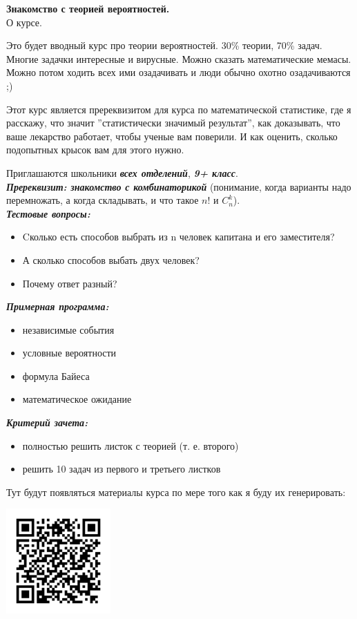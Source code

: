 \documentclass[11pt,a4paper]{article}
\renewcommand{\!}{\textcolor{red}{!}}
\newcommand{\EMPH}[1]{{\large \textit{\textbf{#1}}}}
\begin{document}
\pagestyle{empty}

\begin{center}
	\large
	\textbf{Знакомство с теорией вероятностей.}\\
	\normalsize
	О курсе.
\end{center}


Это будет вводный курс про теории вероятностей. 30\% теории, 70\% задач. Многие задачки интересные и вирусные. Можно сказать математические мемасы. Можно потом ходить всех ими озадачивать и люди обычно охотно озадачиваются ;)

Этот курс является пререквизитом для курса по математической статистике, где я расскажу, что значит ''статистически значимый результат'', как доказывать, что ваше лекарство работает, чтобы ученые вам поверили. И как оценить, сколько подопытных крысок вам для этого нужно.

\vspace{1cm}
Приглашаются школьники \EMPH{всех отделений}, \EMPH{9+ класс}.\\
\EMPH{Пререквизит: знакомство с комбинаторикой} (понимание, когда варианты надо перемножать, а когда складывать, и что такое $n!$ и $C_n^k$).\\
\EMPH{Тестовые вопросы:}
\begin{itemize}
	\setlength\itemsep{0em}
	\item Cколько есть способов выбрать из n человек капитана и его заместителя?
	\item А сколько способов выбать двух человек?
	\item Почему ответ разный?
\end{itemize}
\EMPH{Примерная программа:}
\begin{itemize}
	\setlength\itemsep{0em}
	\item независимые события
	\item условные вероятности
	\item формула Байеса
	\item математическое ожидание
\end{itemize}
\EMPH{Критерий зачета:}
\begin{itemize}
	\item полностью решить листок с теорией (т. е. второго)
	\item решить 10 задач из первого и третьего листков
\end{itemize}

Тут будут появляться материалы курса по мере того как я буду их генерировать:

\begin{center}
	\includegraphics[width=0.3\textwidth]{qr_code.png}
\end{center}
\end{document}
